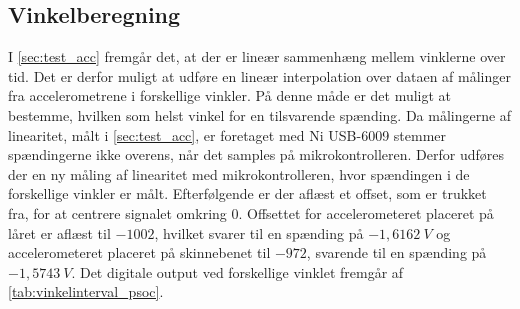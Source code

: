 \subsection{Vinkelberegning}\label{sec:imp_vinkler}
I \autoref{sec:test_acc} fremgår det, at der er lineær sammenhæng mellem vinklerne over tid. Det er derfor muligt at udføre en lineær interpolation over dataen af målinger fra accelerometrene i forskellige vinkler. På denne måde er det muligt at bestemme, hvilken som helst vinkel for en tilsvarende spænding. Da målingerne af linearitet, målt i \autoref{sec:test_acc}, er foretaget med Ni USB-6009 stemmer spændingerne ikke overens, når det samples på mikrokontrolleren. Derfor udføres der en ny måling af linearitet med mikrokontrolleren, hvor spændingen i de forskellige vinkler er målt. Efterfølgende er der aflæst et offset, som er trukket fra, for at centrere signalet omkring 0. Offsettet for accelerometeret placeret på låret er aflæst til $-1002$, hvilket svarer til en spænding på $-1,6162~V$ og accelerometeret placeret på skinnebenet til $-972$, svarende til en spænding på $-1,5743~V$. Det digitale output ved forskellige vinklet fremgår af \autoref{tab:vinkelinterval_psoc}.


